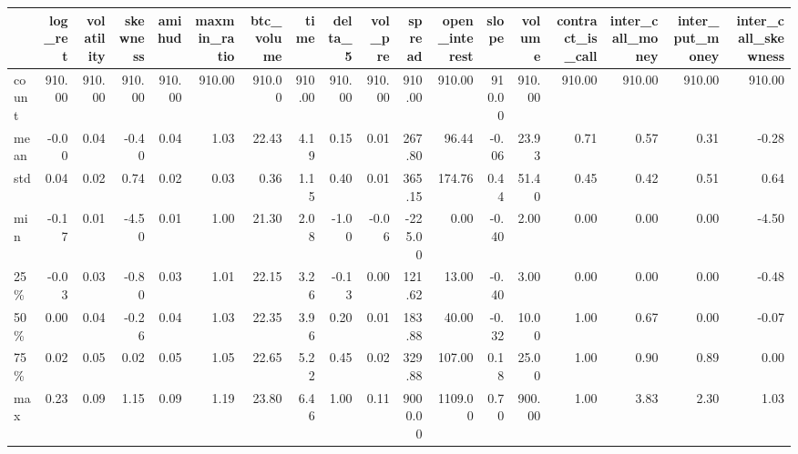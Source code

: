\begin{tabular}{lrrrrrrrrrrrrrrrrr}
\toprule
{} &  log\_ret &  volatility &  skewness &  amihud &  maxmin\_ratio &  btc\_volume &   time &  delta\_5 &  vol\_pre &  spread &  open\_interest &  slope &  volume &  contract\_is\_call &  inter\_call\_money &  inter\_put\_money &  inter\_call\_skewness \\
\midrule
count &   910.00 &      910.00 &    910.00 &  910.00 &        910.00 &      910.00 & 910.00 &   910.00 &   910.00 &  910.00 &         910.00 & 910.00 &  910.00 &            910.00 &            910.00 &           910.00 &               910.00 \\
mean  &    -0.00 &        0.04 &     -0.40 &    0.04 &          1.03 &       22.43 &   4.19 &     0.15 &     0.01 &  267.80 &          96.44 &  -0.06 &   23.93 &              0.71 &              0.57 &             0.31 &                -0.28 \\
std   &     0.04 &        0.02 &      0.74 &    0.02 &          0.03 &        0.36 &   1.15 &     0.40 &     0.01 &  365.15 &         174.76 &   0.44 &   51.40 &              0.45 &              0.42 &             0.51 &                 0.64 \\
min   &    -0.17 &        0.01 &     -4.50 &    0.01 &          1.00 &       21.30 &   2.08 &    -1.00 &    -0.06 & -225.00 &           0.00 &  -0.40 &    2.00 &              0.00 &              0.00 &             0.00 &                -4.50 \\
25\%   &    -0.03 &        0.03 &     -0.80 &    0.03 &          1.01 &       22.15 &   3.26 &    -0.13 &     0.00 &  121.62 &          13.00 &  -0.40 &    3.00 &              0.00 &              0.00 &             0.00 &                -0.48 \\
50\%   &     0.00 &        0.04 &     -0.26 &    0.04 &          1.03 &       22.35 &   3.96 &     0.20 &     0.01 &  183.88 &          40.00 &  -0.32 &   10.00 &              1.00 &              0.67 &             0.00 &                -0.07 \\
75\%   &     0.02 &        0.05 &      0.02 &    0.05 &          1.05 &       22.65 &   5.22 &     0.45 &     0.02 &  329.88 &         107.00 &   0.18 &   25.00 &              1.00 &              0.90 &             0.89 &                 0.00 \\
max   &     0.23 &        0.09 &      1.15 &    0.09 &          1.19 &       23.80 &   6.46 &     1.00 &     0.11 & 9000.00 &        1109.00 &   0.70 &  900.00 &              1.00 &              3.83 &             2.30 &                 1.03 \\
\bottomrule
\end{tabular}
